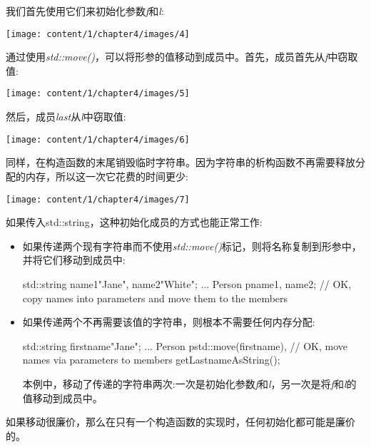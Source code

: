我们首先使用它们来初始化参数\textit{f}和\textit{l}:

\begin{center}
	\texttt{[image: content/1/chapter4/images/4]}
\end{center}

通过使用\textit{std::move()}，可以将形参的值移动到成员中。首先，成员首先从\textit{f}中窃取值:

\begin{center}
	\texttt{[image: content/1/chapter4/images/5]}
\end{center}

然后，成员\textit{last}从\textit{l}中窃取值:

\begin{center}
	\texttt{[image: content/1/chapter4/images/6]}
\end{center}

同样，在构造函数的末尾销毁临时字符串。因为字符串的析构函数不再需要释放分配的内存，所以这一次它花费的时间更少:

\begin{center}
	\texttt{[image: content/1/chapter4/images/7]}
\end{center}

如果传入std::string，这种初始化成员的方式也能正常工作:

\begin{itemize}
	\item 如果传递两个现有字符串而不使用\textit{std::move()}标记，则将名称复制到形参中，并将它们移动到成员中:

	\begin{cppcode}
std::string name1{"Jane"}, name2{"White"};
...
Person p{name1, name2}; // OK, copy names into parameters and move them to the members
	\end{cppcode}
	\item 如果传递两个不再需要该值的字符串，则根本不需要任何内存分配:
	\begin{cppcode}
std::string firstname{"Jane"};
...
Person p{std::move(firstname), // OK, move names via parameters to members
	getLastnameAsString()};
	\end{cppcode}
	本例中，移动了传递的字符串两次:一次是初始化参数\textit{f}和\textit{l}，另一次是将\textit{f}和\textit{l}的值移动到成员中。
\end{itemize}

如果移动很廉价，那么在只有一个构造函数的实现时，任何初始化都可能是廉价的。

